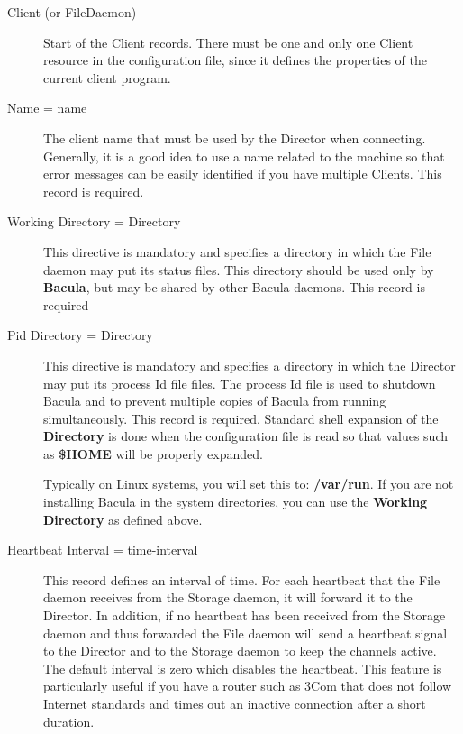 \begin{description}

\item [Client (or FileDaemon)]
   Start of the Client records.  There must be one and only one Client resource
in the  configuration file, since it defines the properties of the  current
client program. 

\item [Name = \lt{}name\gt{}]
   The client name that must be used  by the Director when connecting. Generally,
it is a good idea  to use a name related to the machine so that error messages
can be easily identified if you have multiple Clients.  This record is
required.  

\item [Working Directory = \lt{}Directory\gt{}]
   This directive  is mandatory and specifies a directory in which the File
daemon  may put its status files. This directory should be used only  by {\bf
Bacula}, but may be shared by other Bacula daemons. This  record is required  

\item [Pid Directory = \lt{}Directory\gt{}]
   This directive  is mandatory and specifies a directory in which the Director 
may put its process Id file files. The process Id file is used to  shutdown
Bacula and to prevent multiple copies of  Bacula from running simultaneously. 
This record is required. Standard shell expansion of the {\bf Directory}  is
done when the configuration file is read so that values such  as {\bf \$HOME}
will be properly expanded.  

Typically on Linux systems, you will set this to:  {\bf /var/run}. If you are
not installing Bacula in the  system directories, you can use the {\bf Working
Directory} as  defined above. 

\item [Heartbeat Interval = \lt{}time-interval\gt{}]
   This record defines an interval of time.  For each heartbeat that the
   File daemon receives from the Storage daemon, it will forward it to the
   Director.  In addition, if no heartbeat has been received from the
   Storage daemon and thus forwarded the File daemon will send a heartbeat
   signal to the Director and to the Storage daemon to keep the channels
   active.  The default interval is zero which disables the heartbeat.
   This feature is particularly useful if you have a router such as 3Com
   that does not follow Internet standards and times out an inactive
   connection after a short duration.


\end{description}

